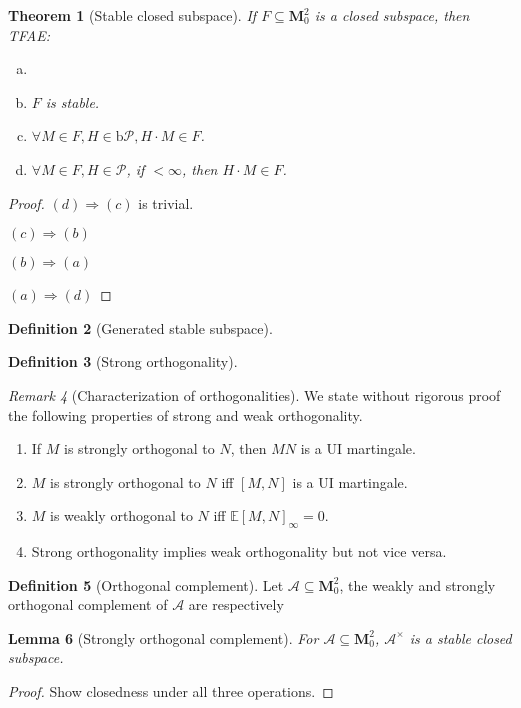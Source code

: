 \documentclass[openany,oneside]{book}
\newtheorem{thm}{Theorem}[section]
\newtheorem{lem}[thm]{Lemma}
\theoremstyle{definition}
\newtheorem{defn}[thm]{Definition}
\theoremstyle{remark}
\newtheorem{rem}[thm]{Remark}
\newcommand{\E}{\mathbb{E}} %
\newcommand{\pred}{\mathcal{P}} %
\newcommand{\bP}{\mathrm{b}\pred} %
\begin{document}
\begin{thm}[Stable closed subspace]
If $F\subseteq \mathbf{M}^2_0$ is a closed subspace, then TFAE:
\begin{enumerate}[(a)]
\item 
\item $F$ is stable.
\item $\forall M\in F, H\in\bP, H\cdot M \in F$.
\item $\forall M\in F, H\in\pred$, if $<\infty$, then $H\cdot M \in F$. 
\end{enumerate}
\end{thm}

\begin{proof}
$(d)\Rightarrow (c)$ is trivial.
\par
$(c)\Rightarrow (b)$
\par
$(b)\Rightarrow (a)$
\par
$(a)\Rightarrow (d)$

\end{proof}

\begin{defn}[Generated stable subspace]

\end{defn}

\begin{defn}[Strong orthogonality]

\end{defn}
\begin{rem}[Characterization of orthogonalities]
We state without rigorous proof the following properties of strong and weak orthogonality. 
\begin{enumerate}
\item If $M$ is strongly orthogonal to $N$, then $MN$ is a UI martingale.
\item $M$ is strongly orthogonal to $N$ iff $[M,N]$ is a UI martingale.
\item $M$ is weakly orthogonal to $N$ iff $\E[M,N]_\infty =0$.
\item Strong orthogonality implies weak orthogonality but not vice versa.
\end{enumerate}
\end{rem}

\begin{defn}[Orthogonal complement]
Let $\mathcal{A} \subseteq \mathbf{M}^2_0$, the weakly and strongly orthogonal complement of $\mathcal{A}$ are respectively 
\end{defn}

\begin{lem}[Strongly orthogonal complement]
For $\mathcal{A} \subseteq \mathbf{M}^2_0$, $\mathcal{A}^\times$ is a stable closed subspace.
\end{lem}
\begin{proof}
Show closedness under all three operations.
\end{proof}
\end{document}
